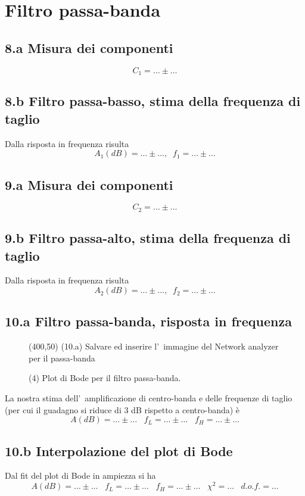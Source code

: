 \documentclass[10pt,a4paper]{article}
\begin{document}
\section*{Filtro passa-banda}

\subsection*{8.a Misura dei componenti}
\[ 
C_1 = \ldots\pm \ldots
\]

\subsection*{8.b Filtro passa-basso, stima della frequenza di taglio}
Dalla risposta in frequenza risulta
\[
A_1(dB) = \ldots \pm \ldots,\;\;f_1 = \ldots\pm \ldots
\]

\subsection*{9.a Misura dei componenti}
\[ 
C_2 = \ldots\pm \ldots
\]

\subsection*{9.b Filtro passa-alto, stima della frequenza di taglio}
Dalla risposta in frequenza risulta
\[
A_2(dB) = \ldots \pm \ldots,\;\;f_2 = \ldots\pm \ldots
\]

\subsection*{10.a Filtro passa-banda, risposta in frequenza}
\begin{figure}[h]
\centering
\framebox(400,50){ (10.a) Salvare ed inserire l'~immagine del Network analyzer per il passa-banda}
\caption{(4) Plot di Bode per il filtro passa-banda.}
\end{figure}
La nostra stima dell'~amplificazione di centro-banda e delle frequenze di taglio (per cui il guadagno si riduce di 3 dB rispetto a centro-banda) \`e
\[
A(dB) = \ldots\pm \ldots \;\;\;f_{L} = \ldots\pm \ldots\;\;\;f_{H} = \ldots\pm \ldots
\]

\subsection*{10.b Interpolazione del plot di Bode}
Dal fit del plot di Bode in ampiezza si ha
\[
A(dB) = \ldots\pm \ldots \;\;\;f_{L} = \ldots\pm \ldots\;\;\;f_{H} = \ldots\pm \ldots\;\;\;\chi^2 = \ldots\;\;\; d.o.f.= \ldots
\]
\end{document}
